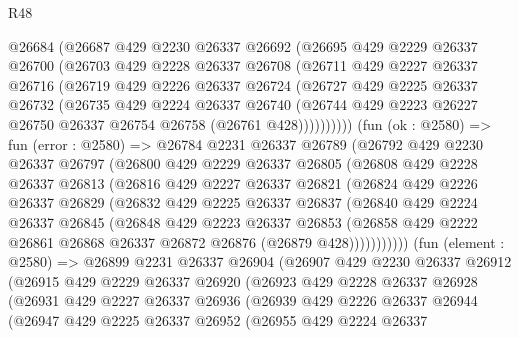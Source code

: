 \begin{lexlean}{R48}
\begin{coremodule}
      @26684
      (@26687
        @429
        @2230
        @26337
        @26692
        (@26695
          @429
          @2229
          @26337
          @26700
          (@26703
            @429
            @2228
            @26337
            @26708
            (@26711
              @429
              @2227
              @26337
              @26716
              (@26719
                @429
                @2226
                @26337
                @26724
                (@26727
                  @429
                  @2225
                  @26337
                  @26732
                  (@26735
                    @429
                    @2224
                    @26337
                    @26740
                    (@26744 @429 @2223 @26227 @26750 @26337 @26754 @26758 (@26761 @428))))))))))
    (fun (ok : @2580) =>
    fun (error : @2580) =>
    @26784
      @2231
      @26337
      @26789
      (@26792
        @429
        @2230
        @26337
        @26797
        (@26800
          @429
          @2229
          @26337
          @26805
          (@26808
            @429
            @2228
            @26337
            @26813
            (@26816
              @429
              @2227
              @26337
              @26821
              (@26824
                @429
                @2226
                @26337
                @26829
                (@26832
                  @429
                  @2225
                  @26337
                  @26837
                  (@26840
                    @429
                    @2224
                    @26337
                    @26845
                    (@26848
                      @429
                      @2223
                      @26337
                      @26853
                      (@26858 @429 @2222 @26861 @26868 @26337 @26872 @26876 (@26879 @428)))))))))))
    (fun (element : @2580) =>
    @26899
      @2231
      @26337
      @26904
      (@26907
        @429
        @2230
        @26337
        @26912
        (@26915
          @429
          @2229
          @26337
          @26920
          (@26923
            @429
            @2228
            @26337
            @26928
            (@26931
              @429
              @2227
              @26337
              @26936
              (@26939
                @429
                @2226
                @26337
                @26944
                (@26947
                  @429
                  @2225
                  @26337
                  @26952
                  (@26955
                    @429
                    @2224
                    @26337

\end{coremodule}
\end{lexlean}
